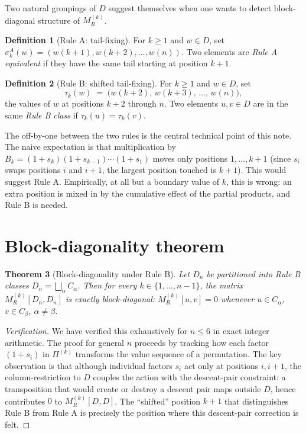 \documentclass[11pt]{article}
\newtheorem{theorem}{Theorem}
\theoremstyle{definition}
\newtheorem{definition}[theorem]{Definition}
\begin{document}
Two natural groupings of $D$ suggest themselves when one wants to detect block-diagonal structure of $M_R^{(k)}$.

\begin{definition}[Rule A: tail-fixing]
For $k \ge 1$ and $w \in D$, set $\sigma_k^A(w) = (w(k+1), w(k+2), \dots, w(n))$. Two elements are \emph{Rule A equivalent} if they have the same tail starting at position $k+1$.
\end{definition}

\begin{definition}[Rule B: shifted tail-fixing]
For $k \ge 1$ and $w \in D$, set
\[
\tau_k(w) \;=\; \bigl(w(k+2),\, w(k+3),\, \dots,\, w(n)\bigr),
\]
the values of $w$ at positions $k+2$ through $n$. Two elements $u,v \in D$ are in the same \emph{Rule B class} if $\tau_k(u) = \tau_k(v)$.
\end{definition}

The off-by-one between the two rules is the central technical point of this note. The naive expectation is that multiplication by $B_k = (1+s_k)(1+s_{k-1})\cdots(1+s_1)$ moves only positions $1,\dots,k+1$ (since $s_i$ swaps positions $i$ and $i+1$, the largest position touched is $k+1$). This would suggest Rule A. Empirically, at all but a boundary value of $k$, this is wrong: an extra position is mixed in by the cumulative effect of the partial products, and Rule B is needed.

\section{Block-diagonality theorem}

\begin{theorem}[Block-diagonality under Rule B]
\label{thm:blockdiag}
Let $D_n$ be partitioned into Rule B classes $D_n = \bigsqcup_\alpha C_\alpha$. Then for every $k \in \{1,\dots,n-1\}$, the matrix $M_R^{(k)}[D_n, D_n]$ is exactly block-diagonal: $M_R^{(k)}[u,v] = 0$ whenever $u \in C_\alpha$, $v \in C_\beta$, $\alpha \ne \beta$.
\end{theorem}

\begin{proof}[Verification]
We have verified this exhaustively for $n \le 6$ in exact integer arithmetic. The proof for general $n$ proceeds by tracking how each factor $(1+s_i)$ in $\Pi^{(k)}$ transforms the value sequence of a permutation. The key observation is that although individual factors $s_i$ act only at positions $i, i+1$, the column-restriction to $D$ couples the action with the descent-pair constraint: a transposition that would create or destroy a descent pair maps outside $D$, hence contributes $0$ to $M_R^{(k)}[D,D]$. The ``shifted'' position $k+1$ that distinguishes Rule B from Rule A is precisely the position where this descent-pair correction is felt.
\end{proof}
\end{document}
